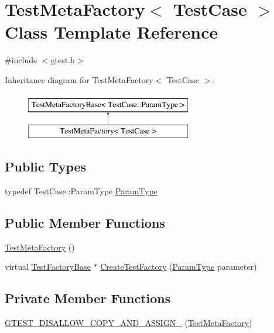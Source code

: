 \hypertarget{classtesting_1_1internal_1_1TestMetaFactory}{\section{\-Test\-Meta\-Factory$<$ \-Test\-Case $>$ \-Class \-Template \-Reference}
\label{dc/d1a/classtesting_1_1internal_1_1TestMetaFactory}
}


{\ttfamily \#include $<$gtest.\-h$>$}

\-Inheritance diagram for \-Test\-Meta\-Factory$<$ \-Test\-Case $>$\-:\begin{figure}[H]
\begin{center}
\leavevmode
\includegraphics[height=2.000000cm]{dc/d1a/classtesting_1_1internal_1_1TestMetaFactory}
\end{center}
\end{figure}
\subsection*{\-Public \-Types}
\begin{DoxyCompactItemize}
\item 
typedef \-Test\-Case\-::\-Param\-Type \hyperlink{classtesting_1_1internal_1_1TestMetaFactory_ab50f5599aaeeb72dd821ed2d71ad8e35}{\-Param\-Type}
\end{DoxyCompactItemize}
\subsection*{\-Public \-Member \-Functions}
\begin{DoxyCompactItemize}
\item 
\hyperlink{classtesting_1_1internal_1_1TestMetaFactory_a02b183eebbb8d484a0a08b01892ebf80}{\-Test\-Meta\-Factory} ()
\item 
virtual \hyperlink{classtesting_1_1internal_1_1TestFactoryBase}{\-Test\-Factory\-Base} $\ast$ \hyperlink{classtesting_1_1internal_1_1TestMetaFactory_acee8d75dcd9b3a90c2f685caf5211605}{\-Create\-Test\-Factory} (\hyperlink{classtesting_1_1internal_1_1TestMetaFactory_ab50f5599aaeeb72dd821ed2d71ad8e35}{\-Param\-Type} parameter)
\end{DoxyCompactItemize}
\subsection*{\-Private \-Member \-Functions}
\begin{DoxyCompactItemize}
\item 
\hyperlink{classtesting_1_1internal_1_1TestMetaFactory_a5ff68771386fd98e05ee099b94cc8ac5}{\-G\-T\-E\-S\-T\-\_\-\-D\-I\-S\-A\-L\-L\-O\-W\-\_\-\-C\-O\-P\-Y\-\_\-\-A\-N\-D\-\_\-\-A\-S\-S\-I\-G\-N\-\_\-} (\hyperlink{classtesting_1_1internal_1_1TestMetaFactory}{\-Test\-Meta\-Factory})
\end{DoxyCompactItemize}


